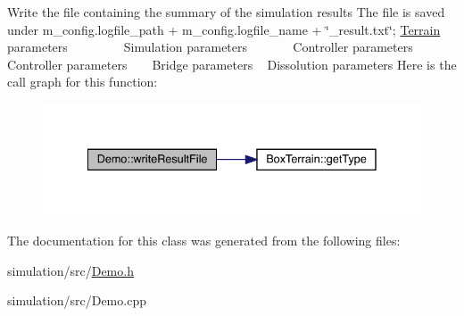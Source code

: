 Write the file containing the summary of the simulation results The file is saved under m\+\_\+config.\+logfile\+\_\+path + m\+\_\+config.\+logfile\+\_\+name + \char`\"{}\+\_\+result.\+txt\char`\"{}; \mbox{\hyperlink{class_terrain}{Terrain}} parameters ~\newline
~\newline
~\newline
~\newline
~\newline
 Simulation parameters ~\newline
~\newline
~\newline
~\newline
 Controller parameters ~\newline
~\newline
~\newline
 Controller parameters ~\newline
~\newline
 Bridge parameters ~\newline
 Dissolution parameters Here is the call graph for this function\+:\nopagebreak
\begin{figure}[H]
\begin{center}
\leavevmode
\includegraphics[width=335pt]{class_demo_a1b09c62228a007c49ddc0639a65341b2_cgraph}
\end{center}
\end{figure}


The documentation for this class was generated from the following files\+:\begin{DoxyCompactItemize}
\item 
simulation/src/\mbox{\hyperlink{_demo_8h}{Demo.\+h}}\item 
simulation/src/Demo.\+cpp\end{DoxyCompactItemize}
